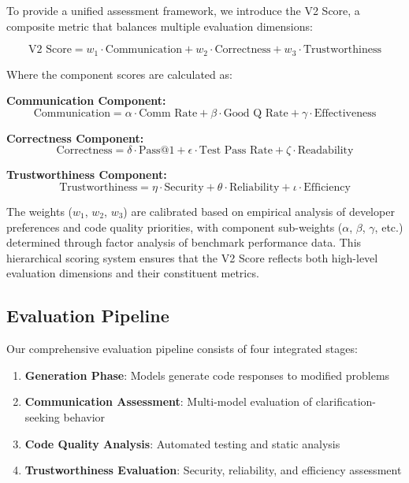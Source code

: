 \documentclass[conference]{IEEEtran}
\begin{document}
To provide a unified assessment framework, we introduce the V2 Score, a composite metric that balances multiple evaluation dimensions:

\begin{equation}
\text{V2 Score} = w_1 \cdot \text{Communication} + w_2 \cdot \text{Correctness} + w_3 \cdot \text{Trustworthiness}
\end{equation}

Where the component scores are calculated as:

\textbf{Communication Component:}
\begin{equation}
\text{Communication} = \alpha \cdot \text{Comm Rate} + \beta \cdot \text{Good Q Rate} + \gamma \cdot \text{Effectiveness}
\end{equation}

\textbf{Correctness Component:}
\begin{equation}
\text{Correctness} = \delta \cdot \text{Pass@1} + \epsilon \cdot \text{Test Pass Rate} + \zeta \cdot \text{Readability}
\end{equation}

\textbf{Trustworthiness Component:}
\begin{equation}
\text{Trustworthiness} = \eta \cdot \text{Security} + \theta \cdot \text{Reliability} + \iota \cdot \text{Efficiency}
\end{equation}

The weights ($w_1$, $w_2$, $w_3$) are calibrated based on empirical analysis of developer preferences and code quality priorities, with component sub-weights ($\alpha$, $\beta$, $\gamma$, etc.) determined through factor analysis of benchmark performance data. This hierarchical scoring system ensures that the V2 Score reflects both high-level evaluation dimensions and their constituent metrics.

\subsection{Evaluation Pipeline}

Our comprehensive evaluation pipeline consists of four integrated stages:

\begin{enumerate}
    \item \textbf{Generation Phase}: Models generate code responses to modified problems
    \item \textbf{Communication Assessment}: Multi-model evaluation of clarification-seeking behavior
    \item \textbf{Code Quality Analysis}: Automated testing and static analysis
    \item \textbf{Trustworthiness Evaluation}: Security, reliability, and efficiency assessment
\end{enumerate}
\end{document}
